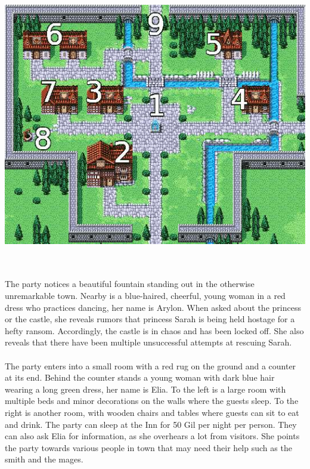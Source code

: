 \begin{center} \includegraphics[width=\columnwidth]{./art/chaosincornelia/cornelia.jpg} \end{center}
%
\clearpage
%
\\\\
%
 The party notices a beautiful fountain standing out in the otherwise unremarkable town.
Nearby is a blue-haired, cheerful, young woman in a red dress who practices dancing, her name is Arylon.
When asked about the princess or the castle, she reveals rumors that princess Sarah is being held hostage for a hefty ransom.
Accordingly, the castle is in chaos and has been locked off.
She also reveals that there have been multiple unsuccessful attempts at rescuing Sarah.
%
\vfill
%
\\\\
%
 The party enters into a small room with a red rug on the ground and a counter at its end.
Behind the counter stands a young woman with dark blue hair wearing a long green dress, her name is Elia.
To the left is a large room with multiple beds and minor decorations on the walls where the guests sleep.
To the right is another room, with wooden chairs and tables where guests can sit to eat and drink.
The party can sleep at the Inn for 50 Gil per night per person.  
They can also ask Elia for information, as she overhears a lot from visitors.
She points the party towards various people in town that may need their help such as the smith and the mages.
